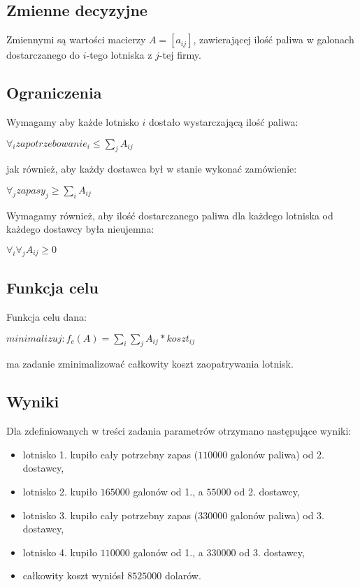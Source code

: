 \documentclass[polish,12pt,titlepage]{article}
\begin{document}
\subsection{Zmienne decyzyjne}

Zmiennymi są wartości macierzy $A = [a_{ij}]$,  zawierającej ilość paliwa w galonach dostarczanego do $i$-tego lotniska z $j$-tej firmy.

\subsection{Ograniczenia}

Wymagamy aby każde lotnisko $i$ dostało wystarczającą ilość paliwa:

\begin{center}
$\forall_{i} zapotrzebowanie_i \leq \sum_{j} A_{ij}$
\end{center}

jak również, aby każdy dostawca był w stanie wykonać zamówienie:

\begin{center}
$\forall_{j} zapasy_{j} \geq \sum_{i} A_{ij}$
\end{center}

Wymagamy również, aby ilość dostarczanego paliwa dla każdego lotniska od każdego dostawcy była nieujemna:

\begin{center}
$\forall_{i} \forall_{j} A_{ij} \geq 0$
\end{center}

\subsection{Funkcja celu}

Funkcja celu dana:

\begin{center}
$minimalizuj: f_c(A) = \sum_{i} \sum_{j} A_{ij} * koszt_{ij}$
\end{center}

ma zadanie zminimalizować całkowity koszt zaopatrywania lotnisk.

\subsection{Wyniki}

Dla zdefiniowanych w treści zadania parametrów otrzymano następujące wyniki:
\begin{itemize}
    \item lotnisko 1. kupiło cały potrzebny zapas ($110 000$ galonów paliwa) od 2. dostawcy,
    \item lotnisko 2. kupiło $165 000$ galonów od 1., a $55000$ od 2. dostawcy,
    \item lotnisko 3. kupiło cały potrzebny zapas ($330 000$ galonów paliwa) od 3. dostawcy,
    \item lotnisko 4. kupiło $110 000$ galonów od 1., a $330 000$ od 3. dostawcy,
    \item całkowity koszt wyniósł $8525000$ dolarów.
\end{itemize}
\end{document}
